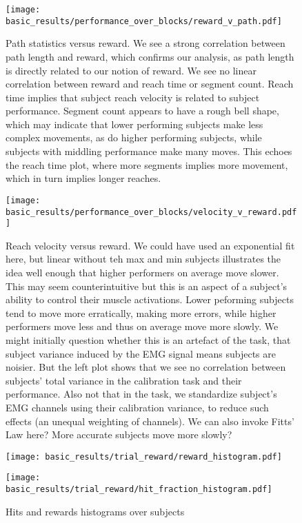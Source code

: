 \documentclass[../main.tex]{subfiles}
\begin{document}
\begin{figure}[H]%
    \centering
    \texttt{[image: basic\_results/performance\_over\_blocks/reward\_v\_path.pdf]}
    \caption[Path statistics versus reward]{Path statistics versus reward. We see a strong correlation between path length and reward, which confirms our analysis, as path length is directly related to our notion of reward. We see no linear correlation between reward and reach time or segment count. Reach time implies that subject reach velocity is related to subject performance. Segment count appears to have a rough bell shape, which may indicate that lower performing subjects make less complex movements, as do higher performing subjects, while subjects with middling performance make many moves. This echoes the reach time plot, where more segments implies more movement, which in turn implies longer reaches.}\label{fig:reward_vs_path_stats}
\end{figure}

\begin{figure}[H]%
    \centering
    \texttt{[image: basic\_results/performance\_over\_blocks/velocity\_v\_reward.pdf]}
    \caption[Reach velocity versus reward]{Reach velocity versus reward. We could have used an exponential fit here, but linear without teh max and min subjects illustrates the idea well enough that higher performers on average move slower. This may seem counterintuitive but this is an aspect of a subject's ability to control their muscle activations. Lower peforming subjects tend to move more erratically, making more errors, while higher performers move less and thus on average move more slowly. We might initially question whether this is an artefact of the task, that subject variance induced by the EMG signal means subjects are noisier. But the left plot shows that we see no correlation between subjects' total variance in the calibration task and their performance. Also not that in the task, we standardize subject's EMG channels using their calibration variance, to reduce such effects (an unequal weighting of channels). We can also invoke Fitts' Law here? More accurate subjects move more slowly?}\label{fig:velocity}
\end{figure}

\begin{figure}
    \centering
    \begin{minipage}{0.49\textwidth}
        \texttt{[image: basic\_results/trial\_reward/reward\_histogram.pdf]}
        \subcaption{}
    \end{minipage}
    \begin{minipage}{0.49\textwidth}
        \texttt{[image: basic\_results/trial\_reward/hit\_fraction\_histogram.pdf]}
      \subcaption{}
    \end{minipage}
    \caption[Hit and reward histograms]{Hits and rewards histograms over subjects}\label{fig:reward_histograms}
\end{figure}
\end{document}
